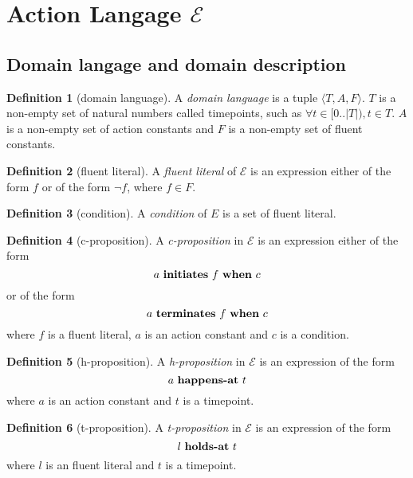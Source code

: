 \section{Action Langage $\mathcal{E}$}\label{sec:e}

\theoremstyle{definition}
\newtheorem{definition}{Definition}[section]

\subsection{Domain langage and domain description}

\begin{definition}[domain language]
  A \emph{domain language} is a tuple $\langle T,A,F\rangle$. $T$ is a non-empty set of natural numbers called timepoints, such as $\forall t \in [0..|T|), t \in T$.
  $A$ is a non-empty set of action constants and $F$ is a non-empty set of fluent constants.
\end{definition}

\begin{definition}[fluent literal]
  A \emph{fluent literal} of $\mathcal{E}$ is an expression either of the form $f$ or of the form $\neg f$, where $f \in F$.
\end{definition}

\begin{definition}[condition]
  A \emph{condition} of $E$ is a set of fluent literal.
\end{definition}

\begin{definition}[c-proposition]
  A \emph{c-proposition} in $\mathcal{E}$ is an expression either of the form
  $$a \text{ \textbf{initiates} } f \text{  \textbf{when} } c$$
  or of the form
  $$a \text{ \textbf{terminates} } f \text{  \textbf{when} } c$$
  where $f$ is a fluent literal, $a$ is an action constant and $c$ is a condition.
\end{definition}

\begin{definition}[h-proposition]
  A \emph{h-proposition} in $\mathcal{E}$ is an expression of the form
  $$a \text{  \textbf{happens-at} } t$$
  where $a$ is an action constant and $t$ is a timepoint.
\end{definition}

\begin{definition}[t-proposition]
  A \emph{t-proposition} in $\mathcal{E}$ is an expression of the form
  $$l \text{  \textbf{holds-at} } t$$
  where $l$ is an fluent literal and $t$ is a timepoint.
\end{definition}

